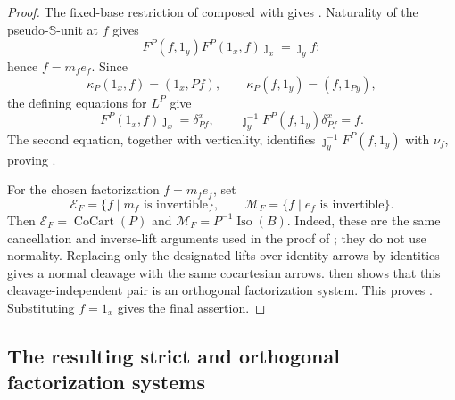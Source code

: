 \documentclass[11pt]{article}
\theoremstyle{plain}
\theoremstyle{definition}
\theoremstyle{remark}
\newcommand{\CoCart}{\operatorname{CoCart}}
\newcommand{\Iso}{\operatorname{Iso}}
\newcommand{\Sq}{\mathbb{S}}
\numberwithin{equation}{section}
\begin{document}
\begin{proof}
The fixed-base restriction of
composed with  gives
.  Naturality of the pseudo-$\Sq$-unit
at $f$ gives
\begin{equation*}
  F^P(f,1_y)F^P(1_x,f)\jmath_x=\jmath_y f;
\end{equation*}
hence $f=m_fe_f$.  Since
\begin{equation*}
  \kappa_P(1_x,f)=(1_x,Pf),
  \qquad
  \kappa_P(f,1_y)=(f,1_{Py}),
\end{equation*}
the defining equations for $L^P$ give
\begin{equation*}
  F^P(1_x,f)\jmath_x=\delta^x_{Pf},
  \qquad
  \jmath_y^{-1}F^P(f,1_y)\delta^x_{Pf}=f.
\end{equation*}
The second equation, together with verticality, identifies
$\jmath_y^{-1}F^P(f,1_y)$ with $\nu_f$, proving
.

For the chosen factorization $f=m_fe_f$, set
\begin{equation*}
  \mathcal E_F=\{f\mid m_f\text{ is invertible}\},
  \qquad
  \mathcal M_F=\{f\mid e_f\text{ is invertible}\}.
\end{equation*}
Then $\mathcal E_F=\CoCart(P)$ and
$\mathcal M_F=P^{-1}\Iso(B)$.  Indeed, these are the same cancellation
and inverse-lift arguments used in the proof of
; they do not use
normality.  Replacing only the designated lifts over identity arrows
by identities gives a normal cleavage with the same cocartesian arrows.
 then shows that this
cleavage-independent pair is an orthogonal factorization system.  This
proves .  Substituting
$f=1_x$ gives the final assertion.
\end{proof}

\subsection{The resulting strict and orthogonal factorization systems}
\end{document}
